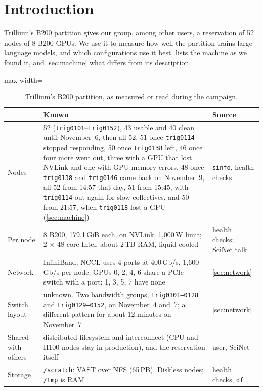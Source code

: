 \section{Introduction}
\label{sec:intro}

Trillium's B200 partition gives our group, among other users, a reservation of 52 nodes of 8 B200 GPUs. We use it to measure how well the partition trains large language models, and which configurations use it best.  lists the machine as we found it, and \cref{sec:machine} what differs from its description.

\begin{table}[h]
  \caption{Trillium's B200 partition, as measured or read during the campaign.}
  \label{tab:machine}
  \centering\small
  \begin{adjustbox}{max width=\linewidth}
  \begin{tabular}{lll}
    \toprule
    & Known & Source \\
    \midrule
    Nodes & 52 (\texttt{trig0101}--\texttt{trig0152}), 43 usable and 40 clean until November~6, then all 52, 51 once \texttt{trig0114} stopped responding, 50 once \texttt{trig0138} left, 46 once four more went out, three with a GPU that lost NVLink and one with GPU memory errors, 48 once \texttt{trig0138} and \texttt{trig0146} came back on November~9, all 52 from 14:57 that day, 51 from 15:45, with \texttt{trig0114} out again for slow collectives, and 50 from 21:57, when \texttt{trig0118} lost a GPU (\cref{sec:machine}) & \texttt{sinfo}, health checks \\
    Per node & 8 B200, 179.1\,GiB each, on NVLink, 1,000\,W limit; 2 $\times$ 48-core Intel, about 2\,TB RAM, liquid cooled & health checks; SciNet talk \\
    Network & InfiniBand; NCCL uses 4 ports at 400\,Gb/s, 1,600\,Gb/s per node. GPUs 0, 2, 4, 6 share a PCIe switch with a port; 1, 3, 5, 7 have none & \cref{sec:network} \\
    Switch layout & unknown. Two bandwidth groups, \texttt{trig0101--0128} and \texttt{trig0129--0152}, on November~4 and~7; a different pattern for about 12 minutes on November~7 & \cref{sec:network} \\
    Shared with others & distributed filesystem and interconnect (CPU and H100 nodes stay in production), and the reservation itself & user, SciNet \\
    Storage & \texttt{/scratch}: VAST over NFS (65\,PB). Diskless nodes; \texttt{/tmp} is RAM & health checks, \texttt{df} \\

\end{tabular}
\end{adjustbox}
\end{table}
